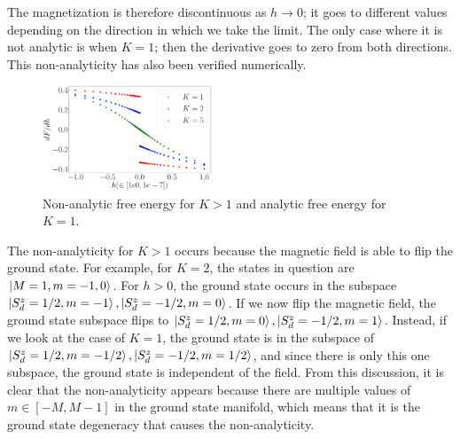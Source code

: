 \documentclass[reprint,prb,superscriptaddress]{revtex4-2}
\begin{document}
The magnetization is therefore discontinuous as \(h\to 0\); it goes to different values depending on the direction in which we take the limit. The only case where it is not analytic is when \(K=1\); then the derivative goes to zero from both directions. This non-analyticity has also been verified numerically.
\begin{figure}[!htpb]
	\centering
	\includegraphics[width=0.45\textwidth]{../numerics/disc_mag_imp.pdf}
	\caption{Non-analytic free energy for \(K>1\) and analytic free energy for \(K=1\).}
\end{figure}

The non-analyticity for \(K>1\) occurs because the magnetic field is able to flip the ground state. For example, for \(K=2\), the states in question are \(\ket{M=1, m=-1,0}\). For \(h>0\), the ground state occurs in the subspace \(\ket{S_d^z=1/2, m=-1},\ket{S_d^z=-1/2,m=0}\). If we now flip the magnetic field, the ground state subspace flips to \(\ket{S_d^z=1/2, m=0},\ket{S_d^z=-1/2,m=1}\). Instead, if we look at the case of \(K=1\), the ground state is in the subspace of \(\ket{S_d^z=1/2,m=-1/2},\ket{S_d^z=-1/2, m=1/2}\), and since there is only this one subspace, the ground state is independent of the field. From this discussion, it is clear that the non-analyticity appears because there are multiple values of \(m \in [-M, M-1]\) in the ground state manifold, which means that it is the ground state degeneracy that causes the non-analyticity.
\end{document}
